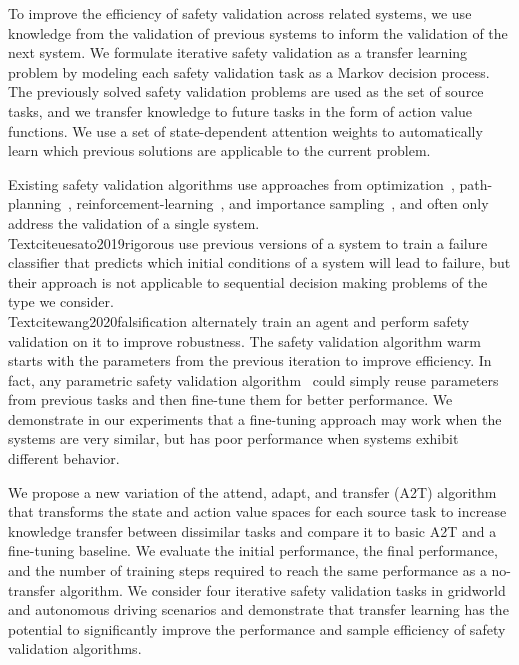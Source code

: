 To improve the efficiency of safety validation across related systems, we use knowledge from the validation of previous systems to inform the validation of the next system. We formulate iterative safety validation as a transfer learning problem by modeling each safety validation task as a Markov decision process. The previously solved safety validation problems are used as the set of source tasks, and we transfer knowledge to future tasks in the form of action value functions. We use a set of state-dependent attention weights to automatically learn which previous solutions are applicable to the current problem.

Existing safety validation algorithms use approaches from optimization~\cite{Mathesen2019falsification}, path-planning~\cite{zutshi2014multiple}, reinforcement-learning~\cite{lee2015adaptive}, and importance sampling~\cite{huang2017accelerated}, and often only address the validation of a single system. \\Textcite{uesato2019rigorous} use previous versions of a system to train a failure classifier that predicts which initial conditions of a system will lead to failure, but their approach is not applicable to sequential decision making problems of the type we consider. \\Textcite{wang2020falsification} alternately train an agent and perform safety validation on it to improve robustness. The safety validation algorithm warm starts with the parameters from the previous iteration to improve efficiency. In fact, any parametric safety validation algorithm~\cite{koren2018adaptive, Akazaki2018falsification, kim2016improving} could simply reuse parameters from previous tasks and then fine-tune them for better performance. We demonstrate in our experiments that a fine-tuning approach may work when the systems are very similar, but has poor performance when systems exhibit different behavior.

We propose a new variation of the attend, adapt, and transfer (A2T) algorithm~\cite{rajendran2017attend} that transforms the state and action value spaces for each source task to increase knowledge transfer between dissimilar tasks and compare it to basic A2T and a fine-tuning baseline. We evaluate the initial performance, the final performance, and the number of training steps required to reach the same performance as a no-transfer algorithm. We consider four iterative safety validation tasks in gridworld and autonomous driving scenarios and demonstrate that transfer learning has the potential to significantly improve the performance and sample efficiency of safety validation algorithms.


